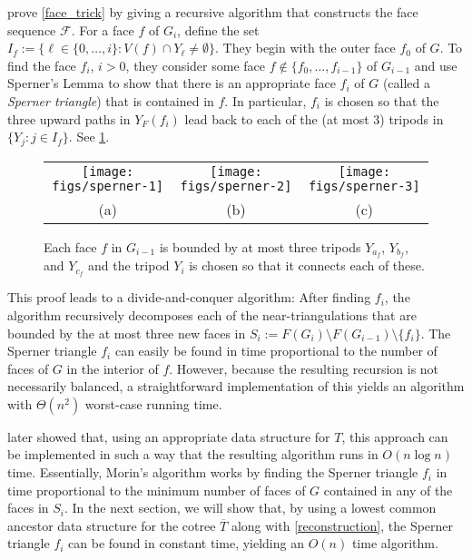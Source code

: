 \documentclass{patmorin}
\begin{document}
\citet{dujmovic.joret.ea:planar} prove \cref{face_trick} by giving a recursive algorithm that constructs the face sequence $\mathcal{F}$.  For a face $f$ of $G_i$, define the set $I_f:=\{\ell\in\{0,\ldots,i\}:V(f)\cap Y_\ell\neq\emptyset\}$.  They begin with the outer face $f_0$ of $G$.  To find the face $f_i$, $i>0$, they consider some face $f\not\in\{f_0,\ldots,f_{i-1}\}$ of $G_{i-1}$ and use Sperner's Lemma to show that there is an appropriate face $f_i$ of $G$ (called a \emph{Sperner triangle}) that is contained in $f$. In particular, $f_i$ is chosen so that the three upward paths in $Y_F(f_i)$ lead back to each of the (at most 3) tripods in $\{Y_j:j\in I_f\}$. See \cref{sperner}.

\begin{figure}
  \begin{center}
    \begin{tabular}{ccc}
      \texttt{[image: figs/sperner-1]} &
      \texttt{[image: figs/sperner-2]} &
      \texttt{[image: figs/sperner-3]} \\
      (a) & (b) & (c)
    \end{tabular}
  \end{center}
  \caption{Each face $f$ in $G_{i-1}$ is bounded by at most three tripods $Y_{a_f}$, $Y_{b_f}$, and $Y_{c_f}$ and the tripod $Y_i$ is chosen so that it connects each of these.}
  \label{sperner}
\end{figure}

This proof leads to a divide-and-conquer algorithm: After finding $f_i$, the algorithm recursively decomposes each of the near-triangulations that are bounded by the at most three new faces in $S_i:=F(G_i)\setminus F(G_{i-1})\setminus \{f_i\}$.  The Sperner triangle $f_i$ can easily be found in time proportional to the number of faces of $G$ in the interior of $f$.  However, because the resulting recursion is not necessarily balanced, a straightforward implementation of this yields an algorithm with $\Theta(n^2)$ worst-case running time.

\citet{morin:fast} later showed that, using an appropriate data structure for $T$, this approach can be implemented in such a way that the resulting algorithm runs in $O(n\log n)$ time.  Essentially, Morin's algorithm works by finding the Sperner triangle $f_i$ in time proportional to the minimum number of faces of $G$ contained in any of the faces in $S_i$.  In the next section, we will show that, by using a lowest common ancestor data structure for the cotree $\overline{T}$ along with \cref{reconstruction}, the Sperner triangle $f_i$ can be found in constant time, yielding an $O(n)$ time algorithm.
\end{document}
